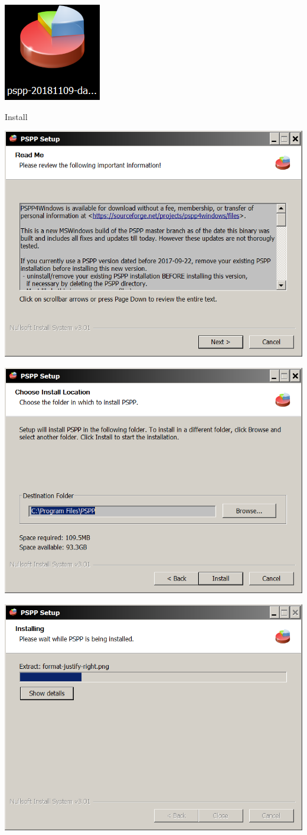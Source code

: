 \documentclass[
]{book}
\begin{document}
\includegraphics[width=0.65\linewidth]{images/psppdownload}

Install

\includegraphics[width=0.65\linewidth]{images/psppinstall}

\includegraphics[width=0.65\linewidth]{images/psppinstall2}

\includegraphics[width=0.65\linewidth]{images/psppinstall3}
\end{document}
